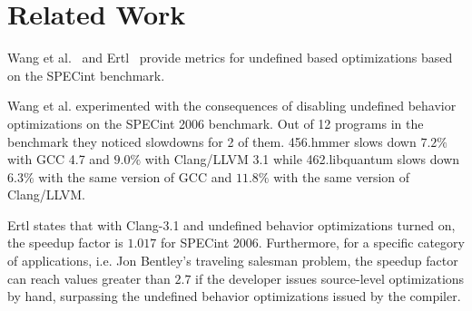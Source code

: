 \section{Related Work} \label{sec:rl}

Wang et al.~\cite{wang2012undefined} and Ertl~\cite{ertl2015every}
provide metrics for undefined based optimizations based on the SPECint
benchmark.

Wang et al. experimented with the consequences of disabling undefined
behavior optimizations on the SPECint 2006 benchmark. Out of 12 programs
in the benchmark they noticed slowdowns for 2 of them. 456.hmmer slows
down $7.2\%$ with GCC 4.7 and $9.0\%$ with Clang/LLVM 3.1 while
462.libquantum slows down $6.3\%$ with the same version of GCC and
$11.8\%$ with the same version of Clang/LLVM.

Ertl states that with Clang-3.1 and undefined behavior optimizations
turned on, the speedup factor is $1.017$ for SPECint 2006. Furthermore,
for a specific category of applications, i.e. Jon Bentley's traveling
salesman problem, the speedup factor can reach values greater than $2.7$
if the developer issues source-level optimizations by hand, surpassing
the undefined behavior optimizations issued by the compiler.
